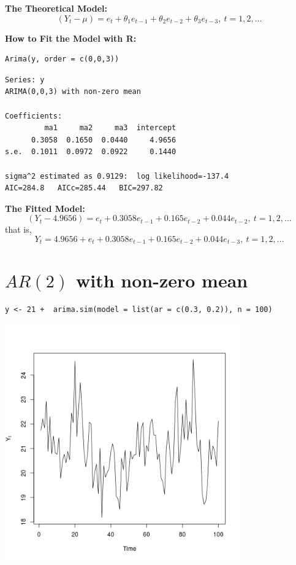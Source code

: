 \documentclass[12pt]{article}
\begin{document}
\noindent
\textbf{The Theoretical Model:} 
\[
(Y_{t} - \mu) = e_{t} + \theta_{1}e_{t - 1} + \theta_{2}e_{t - 2} + \theta_{3}e_{t - 3},\ t = 1,2,\ldots
\]

\noindent
\textbf{How to Fit the Model with R:}

\begin{verbatim}
Arima(y, order = c(0,0,3))
\end{verbatim}





\begin{verbatim}
Series: y 
ARIMA(0,0,3) with non-zero mean 

Coefficients:
         ma1     ma2     ma3  intercept
      0.3058  0.1650  0.0440     4.9656
s.e.  0.1011  0.0972  0.0922     0.1440

sigma^2 estimated as 0.9129:  log likelihood=-137.4
AIC=284.8   AICc=285.44   BIC=297.82
\end{verbatim}

\noindent
\textbf{The Fitted Model:} 
\[
(Y_{t} - 4.9656) = e_{t} + 0.3058 e_{t - 1} + 0.165 e_{t - 2} + 0.044 e_{t - 2},\ t = 1,2,\ldots
\]
that is,
\[
Y_{t} = 4.9656 + e_{t} + 0.3058 e_{t - 1} + 0.165 e_{t - 2} + 0.044 e_{t - 3},\ t = 1,2,\ldots
\]
\section*{$AR(2)$ with non-zero mean}
\label{sec-4}


\begin{verbatim}
y <- 21 +  arima.sim(model = list(ar = c(0.3, 0.2)), n = 100)
\end{verbatim}





\includegraphics[width=4.0in]{img/ar2nzm.png}
\end{document}
